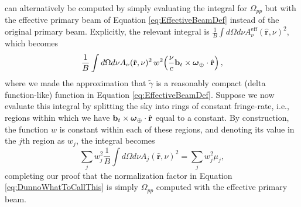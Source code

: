 \documentclass[twocolumn,apj,numberedappendix]{emulateapj}
\newcommand{\rhat}{\hat{\mathbf{r}}}
\begin{document}
can alternatively be computed by simply evaluating the integral for $\Omega_{pp}$ but with the
effective primary beam of Equation \eqref{eq:EffectiveBeamDef} instead of the original primary beam. 
Explicitly, the relevant integral is $\frac{1}{B} \int d\Omega d\nu A^\textrm{eff}_{\nu} ( \rhat, \nu)^2$, which becomes
\begin{equation}
\frac{1}{B} \int d\Omega d\nu A_{\nu} ( \rhat, \nu)^2 \,w^2\!\left( \frac{\nu}{c} \mathbf{b}_t \times \boldsymbol \omega_\Earth \cdot \rhat  \right),
\end{equation}
where we made the approximation that $ \tilde{\gamma}$ is a reasonably compact (delta function-like) function in Equation \eqref{eq:EffectiveBeamDef}.
Suppose we now evaluate this integral by splitting the sky into rings of constant fringe-rate, i.e., regions within which
we have $ \mathbf{b}_t \times \boldsymbol \omega_\Earth \cdot \rhat$ equal to a constant. By construction, the function $w$ is
constant within each of these regions, and denoting its value in the $j$th region as $w_j$, the integral becomes
\begin{equation}
\sum_j w_j^2 \frac{1}{B}  \int d\Omega d\nu A_j ( \rhat, \nu)^2 = \sum_j w_j^2 \mu_j ,
\end{equation}
completing our proof that the normalization factor in Equation \eqref{eq:DunnoWhatToCallThis} is simply
$\Omega_{pp}$ computed with the effective primary beam.
%
\end{document}
